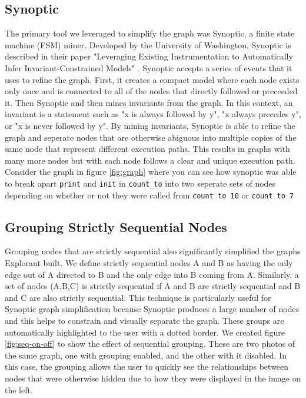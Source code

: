 \subsection{Synoptic}
\label{sec:synoptic}
The primary tool we leveraged to simplify the graph was Synoptic, a finite state machine (FSM) miner. Developed by the University of Washington, Synoptic is described in their paper "Leveraging Existing Instrumentation to Automatically Infer Invariant-Constrained Models" \cite{synoptic}. Synoptic accepts a series of events that it uses to refine the graph. First, it creates a compact model where each node exists only once and is connected to all of the nodes that directly followed or preceeded it. Then Synoptic and then mines invariants from the graph. In this context, an invariant is a statement such as "x is always followed by y", "x always precedes y", or "x is never followed by y". By mining invariants, Synoptic is able to refine the graph and seperate nodes that are otherwise abiguous into multiple copies of the same node that represent different execution paths. This results in graphs with many more nodes but with each node follows a clear and unique execution path. Consider the graph in figure \ref{fig:graph} where you can see how synoptic was able to break apart \texttt{print} and \texttt{init} in \texttt{count\_to} into two seperate sets of nodes depending on whether or not they were called from \texttt{count to 10} or \texttt{count to 7}


\subsection{Grouping Strictly Sequential Nodes}
Grouping nodes that are strictly sequential also significantly simplified the graphs Explorant built. We define strictly sequential nodes A and B as having the only edge out of A directed to B and the only edge into B coming from A. Similarly, a set of nodes (A,B,C) is strictly sequential if A and B are strictly sequential and B and C are also strictly sequential. This technique is particularly useful for Synoptic graph simplification because Synoptic produces a large number of nodes and this helps to constrain and visually separate the graph. These groups are automatically highlighted to the user with a dotted border. We created figure \ref{fig:seq-on-off} to show the effect of sequential grouping. These are two photos of the same graph, one with grouping enabled, and the other with it disabled. In this case, the grouping allows the user to quickly see the relationships between nodes that were otherwise hidden due to how they were displayed in the image on the left.


